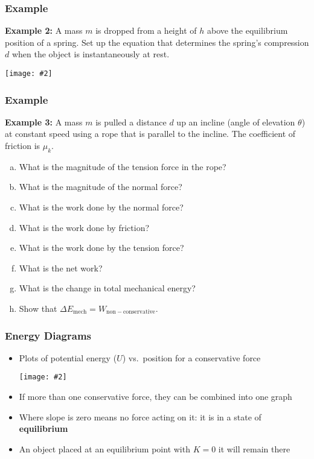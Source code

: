 \documentclass[12pt,compress,aspectratio=169]{beamer}
\newcommand{\pic}[2]{\texttt{[image: \#2]}}
\begin{document}
\begin{frame}
  \frametitle{Example}
  \textbf{Example 2:} A mass $m$ is dropped from a height of $h$ above the
  equilibrium position of a spring. Set up the equation that determines the
  spring's compression $d$ when the object is instantaneously at rest.
  \begin{center}
    \pic{.35}{spring-example1.png}
  \end{center}
\end{frame}


\begin{frame}
  \frametitle{Example}
  \textbf{Example 3:} A mass $m$ is pulled a distance $d$ up an incline (angle
  of elevation $\theta$) at constant speed using a rope that is parallel to
  the incline. The coefficient of friction is $\mu_k$.
  \begin{enumerate}[(a)]
  \item What is the magnitude of the tension force in the rope?
  \item What is the magnitude of the normal force?
  \item What is the work done by the normal force?
  \item What is the work done by friction?
  \item What is the work done by the tension force?
  \item What is the net work?
  \item What is the change in total mechanical energy?
  \item Show that $\Delta E_\mathrm{mech}=W_\mathrm{non-conservative}$.
  \end{enumerate}
\end{frame}


\begin{frame}
  \frametitle{Energy Diagrams}
  \begin{itemize}
  \item Plots of potential energy ($U$) vs.\ position for a conservative force
    \begin{center}
      \pic{.5}{energy-diagram.png}
    \end{center}
  \item If more than one conservative force, they can be combined into one graph
  \item Where slope is zero means no force acting on it: it is in a state of
    \textbf{equilibrium}
  \item An object placed at an equilibrium point with $K=0$ it will remain there
  \end{itemize}
\end{frame}
\end{document}
